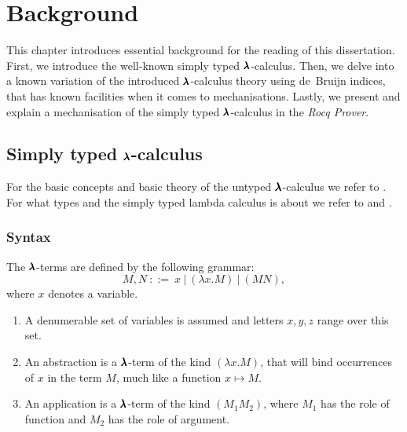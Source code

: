\chapter{Background}
\label{c:background}


This chapter introduces essential background for the reading of this dissertation.
First, we introduce the well-known simply typed $\pmb{\lambda}$-calculus.
Then, we delve into a known variation of the introduced $\pmb{\lambda}$-calculus theory using de~Bruijn indices, that has known facilities when it comes to mechanisations.
Lastly, we present and explain a mechanisation of the simply typed $\pmb{\lambda}$-calculus in the \textit{Rocq Prover}.

\section{Simply typed $\pmb{\lambda}$-calculus}

For the basic concepts and basic theory of the untyped $\pmb{\lambda}$-calculus we refer to \cite{Barendregt1987}.
For what types and the simply typed lambda calculus is about we refer to \cite{Barendregt2013} and \cite{Hindley1997}.

\subsection{Syntax}

\begin{definition}
  The $\pmb{\lambda}$-terms are defined by the following grammar:
  \[
    M, N \ ::= \ x \ | \ (\lambda x . M) \ | \ (M N) ,
  \]
  where $x$ denotes a variable.
\end{definition}

\begin{remark} \hfill
  \begin{enumerate}
  \item A denumerable set of variables is assumed and letters $x, y, z$ range over this set.
  \item An abstraction is a $\pmb{\lambda}$-term of the kind $(\lambda x. M)$, that will bind occurrences of $x$ in the term $M$, much like a function $x \mapsto M$.
  \item An application is a $\pmb{\lambda}$-term of the kind $(M_1 M_2)$, where $M_1$ has the role of function and $M_2$ has the role of argument.
  \end{enumerate}
\end{remark}

